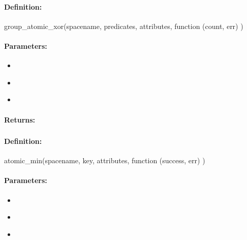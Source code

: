 \paragraph{Definition:}
\begin{javascriptcode}
group_atomic_xor(spacename, predicates, attributes, function (count, err) {})
\end{javascriptcode}
\paragraph{Parameters:}
\begin{itemize}[noitemsep]
\item {}\\

\item {}\\

\item {}\\

\end{itemize}

\paragraph{Returns:}


\pagebreak
\subsubsection{}
\label{api:nodejs:atomic_min}


\paragraph{Definition:}
\begin{javascriptcode}
atomic_min(spacename, key, attributes, function (success, err) {})
\end{javascriptcode}
\paragraph{Parameters:}
\begin{itemize}[noitemsep]
\item {}\\

\item {}\\

\item {}\\

\end{itemize}

